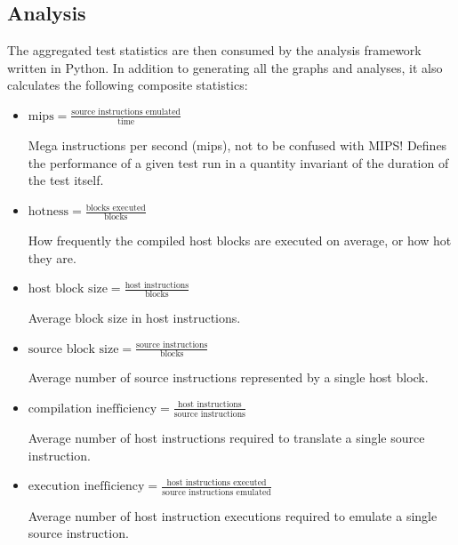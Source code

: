 \subsection{Analysis}

The aggregated test statistics are then consumed by the analysis framework written in Python. In addition to generating all the graphs and analyses, it also calculates the following composite statistics:

\begin{itemize}
    \item \textbf{$\text{mips} = \frac{\text{source instructions emulated}}{\text{time}}$}
    
    Mega instructions per second (mips), not to be confused with MIPS! Defines the performance of a given test run in a quantity invariant of the duration of the test itself.

    \item \textbf{$\text{hotness} = \frac{\text{blocks executed}}{\text{blocks}}$}
    
    How frequently the compiled host blocks are executed on average, or how hot they are.

    \item \textbf{$\text{host block size} = \frac{\text{host instructions}}{\text{blocks}}$}
    
    Average block size in host instructions.

    \item \textbf{$\text{source block size} = \frac{\text{source instructions}}{\text{blocks}}$}

    Average number of source instructions represented by a single host block.

    \item \textbf{$\text{compilation inefficiency} = \frac{\text{host instructions}}{\text{source instructions}}$}
    
    Average number of host instructions required to translate a single source instruction.
    
    \item \textbf{$\text{execution inefficiency} = \frac{\text{host instructions executed}}{\text{source instructions emulated}}$}
    
    Average number of host instruction executions required to emulate a single source instruction.
\end{itemize}